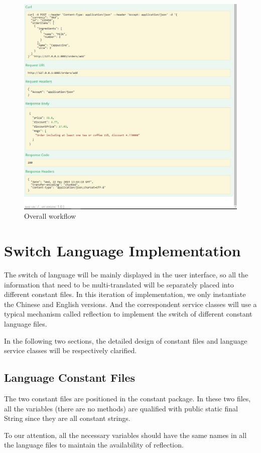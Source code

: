 \documentclass[a4paper]{report}
\begin{document}
\begin{figure}
  \centering
  \includegraphics[scale=0.45]{swagger1.png}
  \caption{Overall workflow}\label{4}
\end{figure}

\section{Switch Language Implementation}
\par The switch of language will be mainly displayed in the user interface, so all the information that need to be multi-translated will be separately placed into  different constant files. In this iteration of implementation, we only instantiate the Chinese and English versions. And the correspondent service classes will use a typical mechanism called reflection to implement the switch of different constant language files.
\par In the following two sections, the detailed design of constant files and language service classes will be respectively clarified.
\subsection{Language Constant Files}
\par The two constant files are positioned in the constant package. In these two files, all the variables (there are no methods) are qualified with public static final String since they are all constant strings.
\par To our attention, all the necessary variables should have the same names in all the language files to maintain the availability of reflection.
\end{document}
